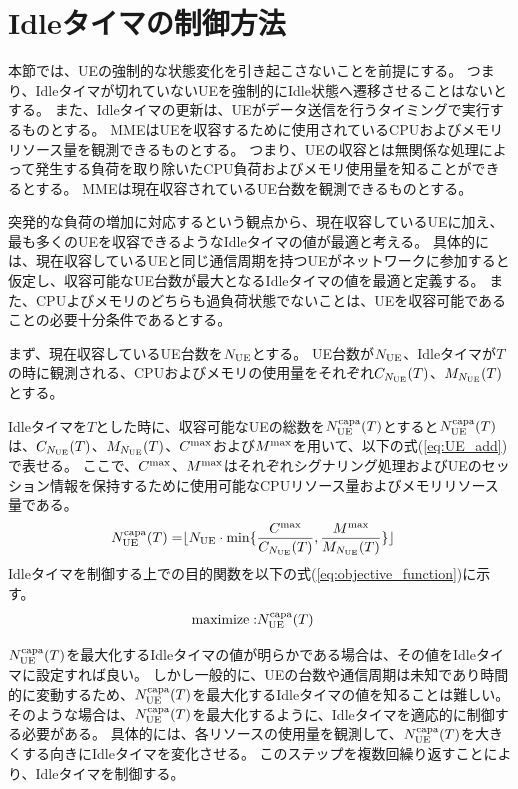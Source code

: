 \documentclass[a4j]{ujarticle}
\begin{document}
\section{Idleタイマの制御方法}
\label{sec:hard-state}
本節では、UEの強制的な状態変化を引き起こさないことを前提にする。
つまり、Idleタイマが切れていないUEを強制的にIdle状態へ遷移させることはないとする。
また、Idleタイマの更新は、UEがデータ送信を行うタイミングで実行するものとする。
MMEはUEを収容するために使用されているCPUおよびメモリリソース量を観測できるものとする。
つまり、UEの収容とは無関係な処理によって発生する負荷を取り除いたCPU負荷およびメモリ使用量を知ることができるとする。
MMEは現在収容されているUE台数を観測できるものとする。

突発的な負荷の増加に対応するという観点から、現在収容しているUEに加え、最も多くのUEを収容できるようなIdleタイマの値が最適と考える。
具体的には、現在収容しているUEと同じ通信周期を持つUEがネットワークに参加すると仮定し、収容可能なUE台数が最大となるIdleタイマの値を最適と定義する。
また、CPUよびメモリのどちらも過負荷状態でないことは、UEを収容可能であることの必要十分条件であるとする。

まず、現在収容しているUE台数を$N_{\rm UE}$とする。
UE台数が$N_{\rm UE}$、Idleタイマが$T$の時に観測される、CPUおよびメモリの使用量をそれぞれ$C_{N_{\rm UE}}(T)$、$M_{N_{\rm UE}}(T)$とする。

Idleタイマを$T$とした時に、収容可能なUEの総数を$N_{\rm UE}^{\rm capa}(T)$とすると$N_{\rm UE}^{\rm capa}(T)$は、$C_{N_{\rm UE}}(T)$、$M_{N_{\rm UE}}(T)$、$C^{\rm max}$および$M^{\rm max}$を用いて、以下の式(\ref{eq:UE_add})で表せる。
ここで、$C^{\rm max}$、$M^{\rm max}$はそれぞれシグナリング処理およびUEのセッション情報を保持するために使用可能なCPUリソース量およびメモリリソース量である。
\begin{eqnarray}
   N_{\rm UE}^{\rm capa}(T) =& \lfloor N_{\rm UE} \cdot \min \{\frac{C^{\rm max}}{C_{N_{\rm UE}}(T)}, \frac{M^{\rm max}}{M_{N_{\rm UE}}(T)}\} \rfloor\label{eq:UE_add}
\end{eqnarray}
Idleタイマを制御する上での目的関数を以下の式(\ref{eq:objective_function})に示す。
\begin{eqnarray}
  \text{maximize} :& N_{\rm UE}^{\rm capa}(T)
  \label{eq:objective_function}
\end{eqnarray}

$N_{\rm UE}^{\rm capa}(T)$を最大化するIdleタイマの値が明らかである場合は、その値をIdleタイマに設定すれば良い。
しかし一般的に、UEの台数や通信周期は未知であり時間的に変動するため、$N_{\rm UE}^{\rm capa}(T)$を最大化するIdleタイマの値を知ることは難しい。
そのような場合は、$N_{\rm UE}^{\rm capa}(T)$を最大化するように、Idleタイマを適応的に制御する必要がある。
具体的には、各リソースの使用量を観測して、$N_{\rm UE}^{\rm capa}(T)$を大きくする向きにIdleタイマを変化させる。
このステップを複数回繰り返すことにより、Idleタイマを制御する。
\end{document}
